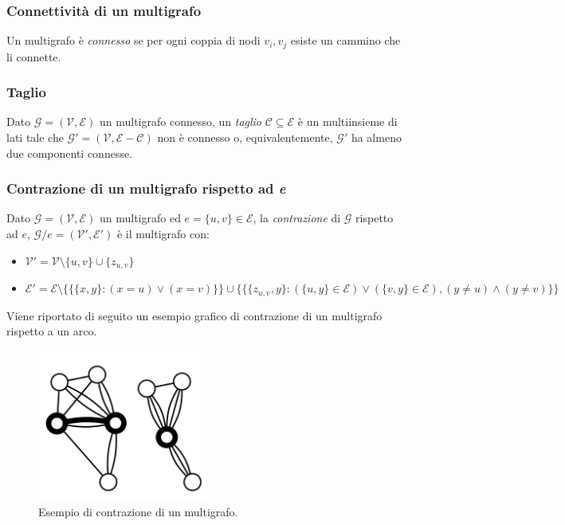 \subsubsection*{Connettività di un multigrafo}
Un multigrafo è \textit{connesso} se per ogni coppia di nodi $v_i, v_j$ esiste un cammino che li connette.

\subsubsection*{Taglio}
Dato $\mathcal{G}=(\mathcal{V}, \mathcal{E})$ un multigrafo connesso, un \textit{taglio} $\mathcal{C} \subseteq \mathcal{E}$ è un multiinsieme di lati tale che $\mathcal{G}{}'=(\mathcal{V}, \mathcal{E}-\mathcal{C})$ non è connesso o, equivalentemente, $\mathcal{G}{}'$ ha almeno due componenti connesse.

\subsubsection*{Contrazione di un multigrafo rispetto ad \textit{e}}
Dato $\mathcal{G}=(\mathcal{V}, \mathcal{E})$ un multigrafo ed $e=\{u,v\} \in \mathcal{E}$, la \textit{contrazione} di $\mathcal{G}$ rispetto ad $e$, $\mathcal{G}/e=(\mathcal{V}{}', \mathcal{E}{}')$ è il multigrafo con:
\begin{itemize}
    \item[] $\mathcal{V}{}'=\mathcal{V} \setminus \{u, v\} \cup \{z_{u,v}\}$
    \item[] $\mathcal{E}{}'=\mathcal{E} \setminus \{\{\{x, y\}: (x=u) \vee (x=v)\}\} \cup \{\{\{z_{u,v}, y\}: (\{u,y\} \in \mathcal{E}) \vee (\{v,y\} \in \mathcal{E}), (y\neq u) \wedge (y \neq v) \}\}$
\end{itemize}
Viene riportato di seguito un esempio grafico di contrazione di un multigrafo rispetto a un arco.

\begin{figure}[H]
	\centering
	\includegraphics[width=0.5\textwidth]{res/images/multigraph}
	\caption{Esempio di contrazione di un multigrafo.}
	\label{fig:multigraph_contraction}
\end{figure}
